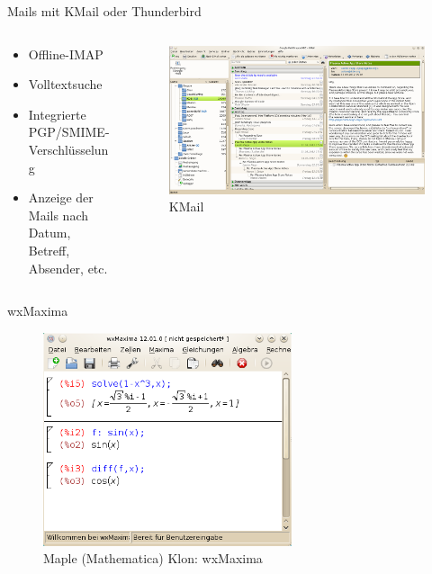 \begin{frame}{Mails mit KMail oder Thunderbird}
  \begin{columns}
    \begin{column}{0.3\textwidth}
      \begin{itemize}
        \item Offline-IMAP
        \item Volltextsuche
        \item Integrierte PGP/SMIME-Verschlüsselung
        \item Anzeige der Mails nach Datum, Betreff, Absender, etc.
      \end{itemize}      
    \end{column}
    \begin{column}{0.7\textwidth}
      \begin{figure}
        \includegraphics[keepaspectratio=true,width=\textwidth]{kmail}
        \caption{KMail}
      \end{figure}
    \end{column}
  \end{columns}
\end{frame}

\begin{frame}{wxMaxima}
  \begin{figure}
    \includegraphics[keepaspectratio=true,width=0.65\textwidth]{wxmaxima}
    \caption{Maple (Mathematica) Klon: wxMaxima}
  \end{figure}
\end{frame}


